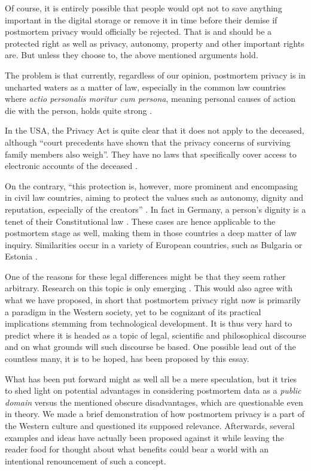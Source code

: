 \documentclass[a4paper]{article}
\begin{document}
Of course, it is entirely possible that people would opt not to save anything important in the digital storage or remove it in time before their demise if postmortem privacy would officially be rejected. That is and should be a protected right as well as privacy, autonomy, property and other important rights are. But unless they choose to, the above mentioned arguments hold.

The problem is that currently, regardless of our opinion, postmortem privacy is in uncharted waters as a matter of law, especially in the common law countries where \textit{actio personalis moritur cum persona}, meaning personal causes of action die with the person, holds quite strong \cite{harbinja2}.

In the USA, the Privacy Act is quite clear that it does not apply to the deceased, although ``court precedents have shown that the privacy concerns of surviving family members also weigh''. They have no laws that specifically cover access to electronic accounts of the deceased \cite{grabianowski}.

On the contrary, ``this protection is, however, more prominent and encompasing in civil law countries, aiming to protect the values such as autonomy, dignity and reputation, especially of the creators'' \cite{harbinja2}. In fact in Germany, a person's dignity is a tenet of their Constitutional law \cite{buitelaar}. These cases are hence applicable to the postmortem stage as well, making them in those countries a deep matter of law inquiry. Similarities occur in a variety of European countries, such as Bulgaria or Estonia \cite{harbinja}.

One of the reasons for these legal differences might be that they seem rather arbitrary. Research on this topic is only emerging \cite{harbinja2}. This would also agree with what we have proposed, in short that postmortem privacy right now is primarily a paradigm in the Western society, yet to be cognizant of its practical implications stemming from technological development.
It is thus very hard to predict where it is headed as a topic of legal, scientific and philosophical discourse and on what grounds will such discourse be based. One possible lead out of the countless many, it is to be hoped, has been proposed by this essay.

\medskip
What has been put forward might as well all be a mere speculation, but it tries to shed light on potential advantages in considering postmortem data as a \emph{public domain} versus the mentioned obscure disadvantages, which are questionable even in theory. We made a brief demonstration of how postmortem privacy is a part of the Western culture and questioned its supposed relevance. Afterwards, several examples and ideas have actually been proposed against it while leaving the reader food for thought about what benefits could bear a world with an intentional renouncement of such a concept.
\end{document}
